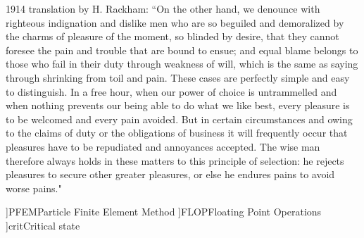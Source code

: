   1914 translation by H. Rackham: ``On the other hand, we denounce with righteous indignation and dislike men who are so beguiled and demoralized by the charms of pleasure of the moment, so blinded by desire, that they cannot foresee the pain and trouble that are bound to ensue; and equal blame belongs to those who fail in their duty through weakness of will, which is the same as saying through shrinking from toil and pain. These cases are perfectly simple and easy to distinguish. In a free hour, when our power of choice is untrammelled and when nothing prevents our being able to do what we like best, every pleasure is to be welcomed and every pain avoided. But in certain circumstances and owing to the claims of duty or the obligations of business it will frequently occur that pleasures have to be repudiated and annoyances accepted. The wise man therefore always holds in these matters to this principle of selection: he rejects pleasures to secure other greater pleasures, or else he endures pains to avoid worse pains."

]{PFEM}{Particle Finite Element Method}
]{FLOP}{Floating Point Operations}
]{crit}{Critical state}
